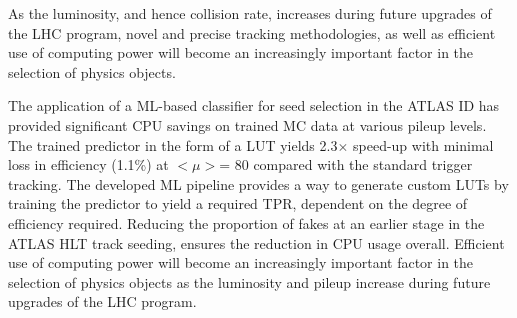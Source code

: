 
As the luminosity, and hence collision rate, increases during future upgrades of the LHC program, novel and precise tracking methodologies, as well as efficient use of computing power will become an increasingly
important factor in the selection of physics objects.

The application of a ML-based classifier for seed selection in the ATLAS ID has provided significant CPU savings on trained MC data at various pileup levels. The trained predictor in the form of a LUT yields 2.3$\times$ speed-up with minimal loss in efficiency (1.1\%) at $< \mu >$= 80 compared with the standard trigger tracking. The developed ML pipeline provides a way to generate custom LUTs by training the predictor to yield a required TPR, dependent on the degree of efficiency required. Reducing the proportion of fakes at an earlier stage in the ATLAS HLT track seeding, ensures the reduction in CPU usage overall. Efficient use of computing power will become an increasingly important factor in the selection of physics objects as the luminosity and pileup increase during future upgrades of the LHC program.


